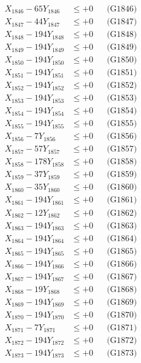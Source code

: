 \documentclass[a4paper,10pt]{article}
\begin{document}
{\begin{align}
X_{1846} - 65Y_{1846} &\leq +0 && \text{(G1846)} \\
X_{1847} - 44Y_{1847} &\leq +0 && \text{(G1847)} \\
X_{1848} - 194Y_{1848} &\leq +0 && \text{(G1848)} \\
X_{1849} - 194Y_{1849} &\leq +0 && \text{(G1849)} \\
X_{1850} - 194Y_{1850} &\leq +0 && \text{(G1850)} \\
\allowbreak
X_{1851} - 194Y_{1851} &\leq +0 && \text{(G1851)} \\
X_{1852} - 194Y_{1852} &\leq +0 && \text{(G1852)} \\
X_{1853} - 194Y_{1853} &\leq +0 && \text{(G1853)} \\
X_{1854} - 194Y_{1854} &\leq +0 && \text{(G1854)} \\
X_{1855} - 194Y_{1855} &\leq +0 && \text{(G1855)} \\
X_{1856} - 7Y_{1856} &\leq +0 && \text{(G1856)} \\
X_{1857} - 57Y_{1857} &\leq +0 && \text{(G1857)} \\
X_{1858} - 178Y_{1858} &\leq +0 && \text{(G1858)} \\
X_{1859} - 37Y_{1859} &\leq +0 && \text{(G1859)} \\
X_{1860} - 35Y_{1860} &\leq +0 && \text{(G1860)} \\
\allowbreak
X_{1861} - 194Y_{1861} &\leq +0 && \text{(G1861)} \\
X_{1862} - 12Y_{1862} &\leq +0 && \text{(G1862)} \\
X_{1863} - 194Y_{1863} &\leq +0 && \text{(G1863)} \\
X_{1864} - 194Y_{1864} &\leq +0 && \text{(G1864)} \\
X_{1865} - 194Y_{1865} &\leq +0 && \text{(G1865)} \\
X_{1866} - 194Y_{1866} &\leq +0 && \text{(G1866)} \\
X_{1867} - 194Y_{1867} &\leq +0 && \text{(G1867)} \\
X_{1868} - 19Y_{1868} &\leq +0 && \text{(G1868)} \\
X_{1869} - 194Y_{1869} &\leq +0 && \text{(G1869)} \\
X_{1870} - 194Y_{1870} &\leq +0 && \text{(G1870)} \\
\allowbreak
X_{1871} - 7Y_{1871} &\leq +0 && \text{(G1871)} \\
X_{1872} - 194Y_{1872} &\leq +0 && \text{(G1872)} \\
X_{1873} - 194Y_{1873} &\leq +0 && \text{(G1873)} \\

\end{align}}
\end{document}
